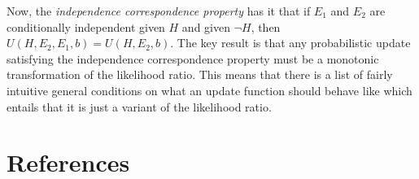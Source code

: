 \documentclass[
  10pt,
  dvipsnames,enabledeprecatedfontcommands]{scrartcl}
\newcommand{\n}{\neg}
\begin{document}
Now, the \emph{independence correspondence property} has it that if
\(E_1\) and \(E_2\) are conditionally independent given \(H\) and given
\(\n H\), then \(U(H, E_2, E_1, b) = U(H, E_2, b)\). The key result is
that any probabilistic update satisfying the independence correspondence
property must be a monotonic transformation of the likelihood ratio.
This means that there is a list of fairly intuitive general conditions
on what an update function should behave like which entails that it is
just a variant of the likelihood ratio.

\hypertarget{references}{%
\section*{References}\label{references}}
\end{document}
